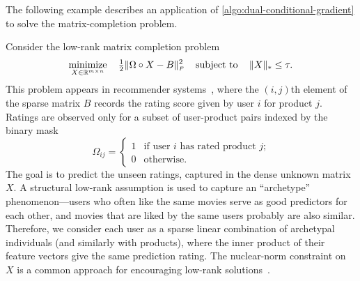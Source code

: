 The following example describes an application of
\autoref{algo:dual-conditional-gradient} to solve the matrix-completion problem.

\begin{example}\label{example:dual-conditional-gradient} Consider the low-rank
  matrix completion problem
  \begin{equation} \label{eq:matrix-completion}
    \displaystyle\mathop{\hbox{\rm minimize}}_{X\in\mathbb{R}^{m\times n}}\enspace\enspace{\textstyle{\frac{1}{2}}}\|\Omega\circ X - B \|_{\scriptscriptstyle F}^2
    \enspace\enspace\mathop{\hbox{\rm subject to}}\enspace\enspace\|X\|_* \le\tau.
  \end{equation}
  This problem appears in recommender systems~\cite{bell2007lessons}, where the
  $(i,j)$th element of the sparse matrix $B$ records the rating score given by user
  $i$ for product $j$. Ratings are observed only for a subset of user-product
  pairs indexed by the binary mask
  \[
    \Omega_{ij} =
    \begin{cases}
      1 & \mbox{if user $i$ has rated product $j$;}
    \\0 & \mbox{otherwise.}
    \end{cases}
  \]
  The goal is to predict the unseen ratings, captured in the dense unknown
  matrix $X$. A structural low-rank assumption is used to capture an
  ``archetype'' phenomenon---users who often like the same movies serve as good
  predictors for each other, and movies that are liked by the same users
  probably are also similar. Therefore, we consider each user as a sparse linear
  combination of archetypal individuals (and similarly with products), where the
  inner product of their feature vectors give the same prediction rating. The
  nuclear-norm constraint on $X$ is a common approach for encouraging low-rank
  solutions~\cite{recht2010guaranteed}.


\end{example}
